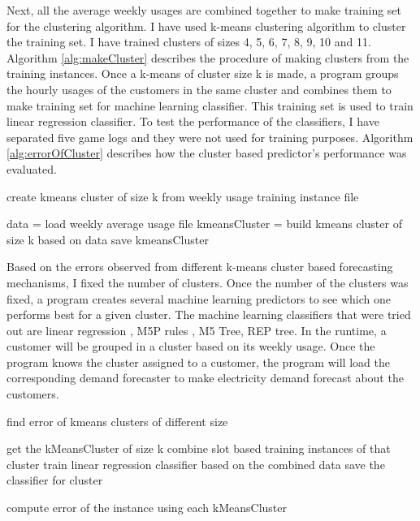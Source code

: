 Next, all the average weekly usages are combined together to make training set for the clustering algorithm. I have used k-means \cite{witten2005data} clustering algorithm to cluster the  training set. I have trained clusters of sizes 4, 5, 6, 7, 8, 9, 10 and 11. Algorithm \ref{alg:makeCluster} describes the procedure of making clusters from the training instances. Once a k-means of cluster size k is made, a program groups the hourly usages of the customers in the same cluster and combines them to make training set for  machine learning classifier. This training set is used to train linear regression classifier. To test the performance of the classifiers, I have separated five game logs and they were not used for training purposes. Algorithm \ref{alg:errorOfCluster} describes how the cluster based predictor's performance was evaluated. 


\begin{algorithm}
\caption{create kmeans cluster of size k from weekly usage training instance file}
\begin{algorithmic} [1]
\STATE data = load weekly average usage file
\STATE kmeansCluster = build kmeans cluster of size k based on data
\STATE save kmeansCluster
\end{algorithmic}
\label{alg:makeCluster}
\end{algorithm}


Based on the errors observed from different k-means cluster based forecasting mechanisms, I fixed the number of clusters. Once the number of the clusters was fixed, a program creates several machine learning predictors to see which one performs best for a given cluster. The machine learning classifiers that were tried out are linear regression \cite{witten2005data}, M5P rules \cite{witten2005data}, M5 Tree\cite{witten2005data}, REP tree\cite{witten2005data}. In the runtime, a customer will be grouped in a cluster based on its weekly usage. Once the program knows the cluster assigned to a customer, the program will load the corresponding demand forecaster to make electricity demand forecast about the customers.

\begin{algorithm}[!h]
\caption{find error of kmeans clusters of different size}
\begin{algorithmic} [1]

    \STATE get the kMeansCluster of size k
        \STATE combine slot based training instances of that cluster
        \STATE train linear regression classifier based on the combined data
        \STATE save the classifier for cluster
    \ENDFOR
\ENDFOR

    \STATE compute error of the instance using each kMeansCluster
\ENDFOR
\end{algorithmic}
\label{alg:errorOfCluster}
\end{algorithm}

